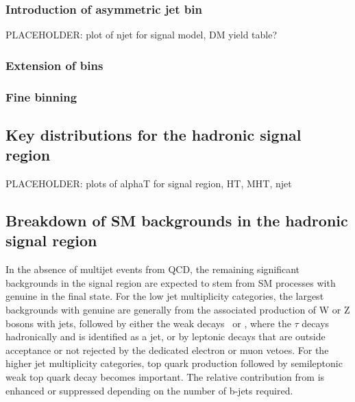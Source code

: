 \subsubsection{Introduction of asymmetric jet bin}


PLACEHOLDER: plot of njet for signal model, DM yield table?

\subsubsection{Extension of \HT bins}

\subsubsection{Fine \njet binning}

\subsection{Key distributions for the hadronic signal
  region\label{sec:mc-data-comp}}

PLACEHOLDER: plots of alphaT for signal region, HT, MHT, njet


\subsection{Breakdown of SM backgrounds in the hadronic signal
  region\label{sec:bkgd-comp}}

In the absence of multijet events from QCD, the remaining significant
backgrounds in the signal region are expected to stem from SM
processes with genuine \met in the final state. For the low jet
multiplicity categories, the largest backgrounds with genuine \met are
generally from the associated production of W or Z bosons with jets,
followed by either the weak decays \znunu\ or \wtaunu, where the
$\tau$ decays hadronically and is identified as a jet, or by leptonic
decays that are outside acceptance or not rejected by the dedicated
electron or muon vetoes. For the higher jet multiplicity categories,
top quark production followed by semileptonic weak top quark decay
becomes important. The relative contribution from \ttbar is enhanced
or suppressed depending on the number of b-jets required. 

